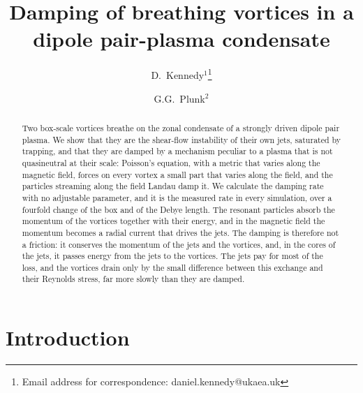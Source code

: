 \documentclass{jpp}
\title{Damping of breathing vortices in a dipole pair-plasma condensate}
\author{D.~Kennedy$^{1}$\thanks{Email address for correspondence: daniel.kennedy@ukaea.uk}
  \and G.G.~Plunk$^{2}$}
\affiliation{$^{1}$UKAEA (United Kingdom Atomic Energy Authority), Culham Campus, Abingdon, Oxfordshire, OX14 3DB, UK\\
$^{2}$Max-Planck-Institut f\"ur Plasmaphysik, Greifswald, Germany}
\begin{document}
\maketitle

\begin{abstract}
Two box-scale vortices breathe on the zonal condensate of a strongly driven dipole pair plasma. We show that they are the shear-flow instability of their own jets, saturated by trapping, and that they are damped by a mechanism peculiar to a plasma that is not quasineutral at their scale: Poisson's equation, with a metric that varies along the magnetic field, forces on every vortex a small part that varies along the field, and the particles streaming along the field Landau damp it. We calculate the damping rate with no adjustable parameter, and it is the measured rate in every simulation, over a fourfold change of the box and of the Debye length. The resonant particles absorb the momentum of the vortices together with their energy, and in the magnetic field the momentum becomes a radial current that drives the jets. The damping is therefore not a friction: it conserves the momentum of the jets and the vortices, and, in the cores of the jets, it passes energy from the jets to the vortices. The jets pay for most of the loss, and the vortices drain only by the small difference between this exchange and their Reynolds stress, far more slowly than they are damped.
\end{abstract}


\section{Introduction}\label{sec:intro}
\end{document}

